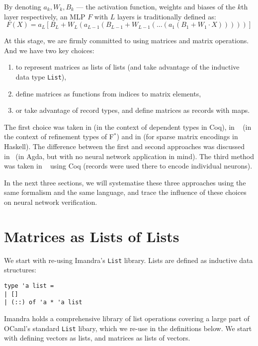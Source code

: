 \documentclass[runningheads]{llncs}
\begin{document}
By denoting $a_k, W_k, B_k$ --- the activation function, weights and biases of the $k$th layer respectively, an MLP $F$ with $L$ layers is traditionally defined as:
\begin{equation}
	F(X) = a_L[B_L + W_L (a_{L-1}(B_{L-1} + W_{L-1}(...(a_1(B_1+W_1\cdot X)))))]
      \end{equation}

      At this stage, we are firmly committed to using matrices and matrix operations. And we have two key choices:
\begin{enumerate}
\item to represent matrices as lists of lists (and take advantage of the inductive data type \lstinline{List}),
\item define matrices as functions from indices to matrix elements,
\item or take advantage of record types, and define matrices as records with maps.  
\end{enumerate}

The first choice was taken in \cite{heras_incidence_2011} (in the context of dependent types in Coq), in ~\cite{KokkeKKAA20} (in the context of refinement types of F$^*$) and in \cite{grant_sparse_1996} (for sparse matrix encodings in Haskell).  The difference between the first and second approaches was
discussed in~\cite{wood_vectors_2019} (in Agda, but with no neural network application in mind).
The third method was taken in ~\cite{MariaBLFGRG22} using Coq  (records were used there to encode individual neurons).

In the next three sections, we will systematise these three approaches using the same formalism and the same language,
and trace the influence of these choices on neural network verification.


\section{Matrices as Lists of Lists} \label{sec:lists}
We start with re-using  Imandra's  \lstinline{List} library. Lists are defined as inductive data structures:

\begin{lstlisting}
type 'a list =
| []
| (::) of 'a * 'a list
\end{lstlisting}


Imandra holds a comprehensive library of list operations covering a large part of OCaml's standard \lstinline{List} libary, which we re-use in the definitions below.
We start with defining vectors as lists, and matrices as lists of vectors. 
\end{document}
